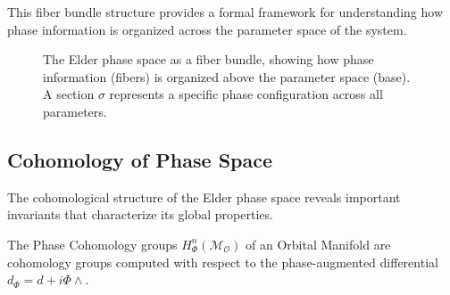 This fiber bundle structure provides a formal framework for understanding how phase information is organized across the parameter space of the system.

\begin{figure}[h]
\centering
{}
\caption{The Elder phase space as a fiber bundle, showing how phase information (fibers) is organized above the parameter space (base). A section $\sigma$ represents a specific phase configuration across all parameters.}
\label{fig:phase_fiber_bundle}
\end{figure}

\subsection{Cohomology of Phase Space}

The cohomological structure of the Elder phase space reveals important invariants that characterize its global properties.

\begin{definition}
The Phase Cohomology groups $H^n_{\Phi}(\mathcal{M}_{\mathcal{O}})$ of an Orbital Manifold are cohomology groups computed with respect to the phase-augmented differential $d_{\Phi} = d + i\Phi \wedge$.
\end{definition}

